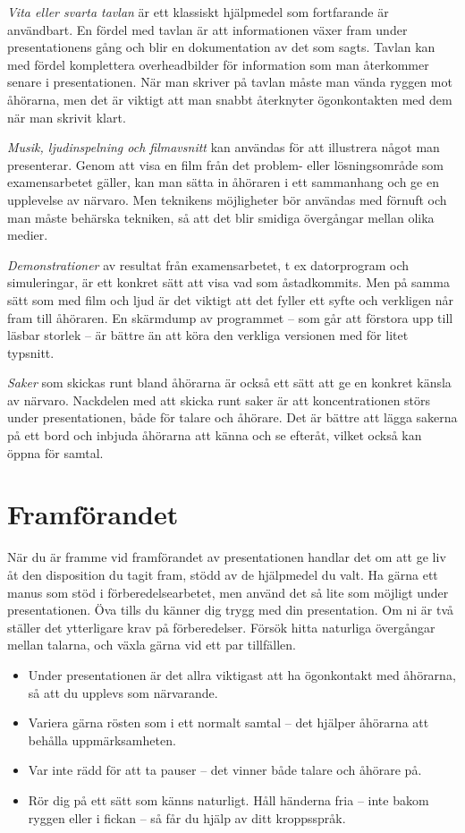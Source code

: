 \emph{Vita eller svarta tavlan} är ett klassiskt hjälpmedel som
fortfarande är användbart. En fördel med tavlan är att informationen
växer fram under presentationens gång och blir en dokumentation av det
som sagts. Tavlan kan med fördel komplettera overheadbilder för
information som man återkommer senare i presentationen. När man skriver
på tavlan måste man vända ryggen mot åhörarna, men det är viktigt att
man snabbt återknyter ögonkontakten med dem när man skrivit klart.

\emph{Musik, ljudinspelning och filmavsnitt} kan användas för att
illustrera något man presenterar. Genom att visa en film från det
problem- eller lösningsområde som examensarbetet gäller, kan man sätta
in åhöraren i ett sammanhang och ge en upplevelse av närvaro. Men
teknikens möjligheter bör användas med förnuft och man måste behärska
tekniken, så att det blir smidiga övergångar mellan olika medier.

\emph{Demonstrationer} av resultat från examensarbetet, t ex
datorprogram och simuleringar, är ett konkret sätt att visa vad som
åstadkommits. Men på samma sätt som med film och ljud är det viktigt att
det fyller ett syfte och verkligen når fram till åhöraren. En skärmdump
av programmet -- som går att förstora upp till läsbar storlek -- är
bättre än att köra den verkliga versionen med för litet typsnitt.

\emph{Saker} som skickas runt bland åhörarna är också ett sätt att ge en
konkret känsla av närvaro. Nackdelen med att skicka runt saker är att
koncentrationen störs under presentationen, både för talare och åhörare.
Det är bättre att lägga sakerna på ett bord och inbjuda åhörarna att
känna och se efteråt, vilket också kan öppna för samtal.

\section{Framförandet}\label{framfuxf6randet}

När du är framme vid framförandet av presentationen handlar det om att
ge liv åt den disposition du tagit fram, stödd av de hjälpmedel du valt.
Ha gärna ett manus som stöd i förberedelsearbetet, men använd det så
lite som möjligt under presentationen. Öva tills du känner dig trygg med
din presentation. Om ni är två ställer det ytterligare krav på
förberedelser. Försök hitta naturliga övergångar mellan talarna, och
växla gärna vid ett par tillfällen.

\begin{itemize}
\item
  Under presentationen är det allra viktigast att ha ögonkontakt med
  åhörarna, så att du upplevs som närvarande.
\item
  Variera gärna rösten som i ett normalt samtal -- det hjälper åhörarna
  att behålla uppmärksamheten.
\item
  Var inte rädd för att ta pauser -- det vinner både talare och åhörare
  på.
\item
  Rör dig på ett sätt som känns naturligt. Håll händerna fria -- inte
  bakom ryggen eller i fickan -- så får du hjälp av ditt kroppsspråk.
\end{itemize}

